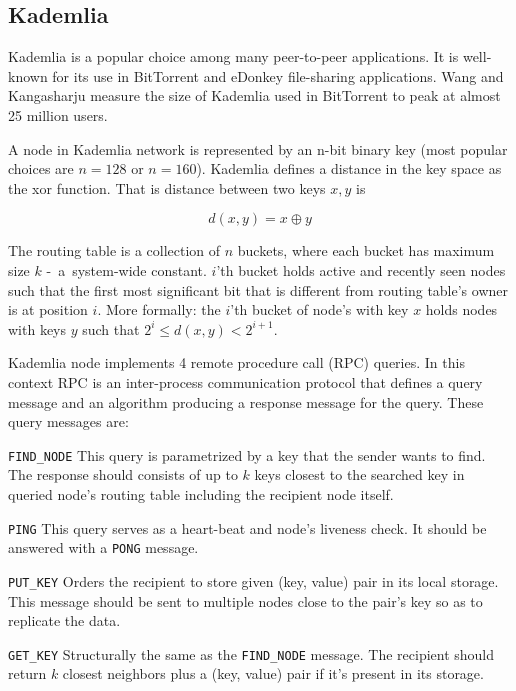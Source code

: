   \subsection{Kademlia}
  Kademlia \cite{may02} is a popular choice among many peer-to-peer
  applications. It is well-known for its use in BitTorrent and eDonkey
  file-sharing applications. Wang and Kangasharju \cite{wan13} measure the size
  of Kademlia used in BitTorrent to peak at almost 25 million users.

  A node in Kademlia network is represented by an n-bit binary key (most popular
  choices are $n = 128$ or $n = 160$). Kademlia defines a distance in the
  key space as the xor function. That is distance between two keys $x, y$ is

  \[ d(x, y) = x \oplus y\]

  The routing table is a collection of $n$ buckets, where each bucket has
  maximum size $k$ -~a~\mbox{system-wide} constant. 
  $i$'th bucket holds active and recently seen nodes such that the first most
  significant bit that is different from routing table's owner is at position
  $i$. More formally: the $i$'th bucket of node's with key $x$ holds nodes with
  keys $y$ such that $2^i \leq d(x, y) < 2^{i+1}$.

  Kademlia node implements 4 remote procedure call (RPC) queries. In this
  context RPC is an inter-process communication protocol that defines a query
  message and an algorithm producing a response message for the query. These
  query messages are:

  \begin{description}
    \item{\texttt{FIND\_NODE}} This query is parametrized by a key that the sender
      wants to find. The response should consists of up to $k$ keys closest to
      the searched key in queried node's routing table including the recipient
      node itself.
    \item{\texttt{PING}} This query serves as a heart-beat and node's liveness
      check. It should be answered with a \texttt{PONG} message.
    \item{\texttt{PUT\_KEY}} Orders the recipient to store given (key, value) pair
      in its local storage. This message should be sent to multiple nodes close
      to the pair's key so as to replicate the data.
    \item{\texttt{GET\_KEY}} Structurally the same as the \texttt{FIND\_NODE}
      message. The recipient should return $k$ closest neighbors plus a (key,
      value) pair if it's present in its storage.
  \end{description}


